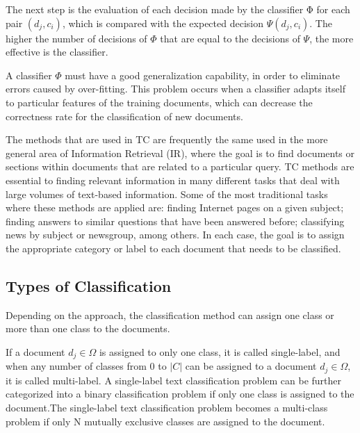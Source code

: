 The next step is the evaluation of each decision made by the classifier
Φ for each pair $(d_j, c_i)$, which is compared with the expected decision $\Psi(d_j, c_i)$. The higher the number of decisions of $\Phi$ that are equal to the decisions of $\Psi$, the more effective is the classifier.

A classifier $\Phi$ must have a good generalization capability, in order to eliminate errors caused by over-fitting. This problem occurs when a classifier adapts itself to particular features of the training documents, which can decrease the correctness rate for the classification of new
documents.

The methods that are used in TC are frequently the same used in the more general area of Information Retrieval (IR), where the goal is to find documents or sections within documents that are related to a particular query. TC methods are essential to finding relevant information in many different tasks that deal with large volumes of text-based information. Some of the most traditional tasks where these methods are applied are: finding Internet pages on a given subject; finding answers to similar questions that have been answered before; classifying news by subject or newsgroup, among others. In each case, the goal is to assign the appropriate category or label to each document that needs to be classified.





\subsection{\hspace*{3pt}Types of Classification}

Depending on the approach, the classification method can assign one class or more than one class to the documents. 

If a document  $ d_j \in \Omega $  is assigned to only one class, it is called single-label, and when any number of classes from 0 to $|C|$ can be assigned to a document $d_j \in \Omega$, it is called multi-label. A single-label text classification problem can be further categorized into a  binary classification problem if only one class is assigned to the document.The single-label text classification problem becomes a multi-class problem if only N mutually exclusive classes are assigned to the document. 

